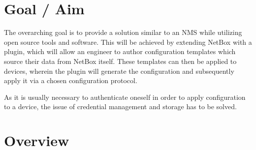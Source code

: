 \section{\label{introduction-goal}Goal / Aim}


The overarching goal is to provide a solution similar to an \acrshort{NMS} while utilizing open source
tools and software.
This will be achieved by extending NetBox with a plugin, which will allow an engineer to author configuration
templates which source their data from NetBox itself. 
These templates can then be applied to devices, wherein the plugin will generate the configuration and subsequently
apply it via a chosen configuration protocol.

As it is usually necessary to authenticate oneself in order to apply configuration to a device,
the issue of credential management and storage has to be solved.






\section{\label{introduction-overview}Overview}




